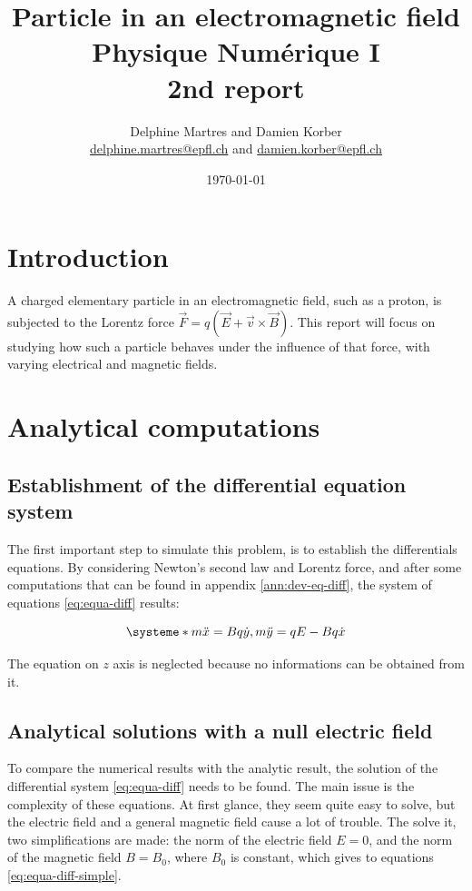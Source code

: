 \documentclass[a4paper,12pt,twoside]{article}
\newcommand{\mail}[1]{{\href{mailto:#1}{#1}}}
\begin{document}
\title{Particle in an electromagnetic field\\{\small Physique Numérique I}\\{\small 2nd report}}
\date{\today}
\author{Delphine Martres and Damien Korber\\{\small \mail{delphine.martres@epfl.ch} and \mail{damien.korber@epfl.ch}}}
\maketitle
\tableofcontents %

\baselineskip=16pt
\parindent=15pt
\parskip=5pt




\section{Introduction}
A charged elementary particle in an electromagnetic field, such as a proton, is subjected to the Lorentz force $\vec{F}=q(\vec{E} + \vec{v} \times \vec{B})$.
This report will focus on studying how such a particle behaves under the influence of that force, with varying electrical and magnetic fields.

\section{Analytical computations}
\subsection{Establishment of the differential equation system}
The first important step to simulate this problem, is to establish the differentials equations.
By considering Newton's second law and Lorentz force, and after some computations that can be found in appendix \ref{ann:dev-eq-diff}, the system of equations \ref{eq:equa-diff} results:

\begin{equation}
\systeme*{m\ddot{x} = Bq\dot{y}, m\ddot{y} = qE - Bq\dot{x}}
\label{eq:equa-diff}
\end{equation}

The equation on $z$ axis is neglected because no informations can be obtained from it.

\subsection{Analytical solutions with a null electric field}
To compare the numerical results with the analytic result, the solution of the differential system \ref{eq:equa-diff} needs to be found.
The main issue is the complexity of these equations.
At first glance, they seem quite easy to solve, but the electric field and a general magnetic field cause a lot of trouble.
The solve it, two simplifications are made: the norm of the electric field $E=0$, and the norm of the magnetic field $B=B_0$, where $B_0$ is constant, which gives to equations \ref{eq:equa-diff-simple}.
\end{document}
